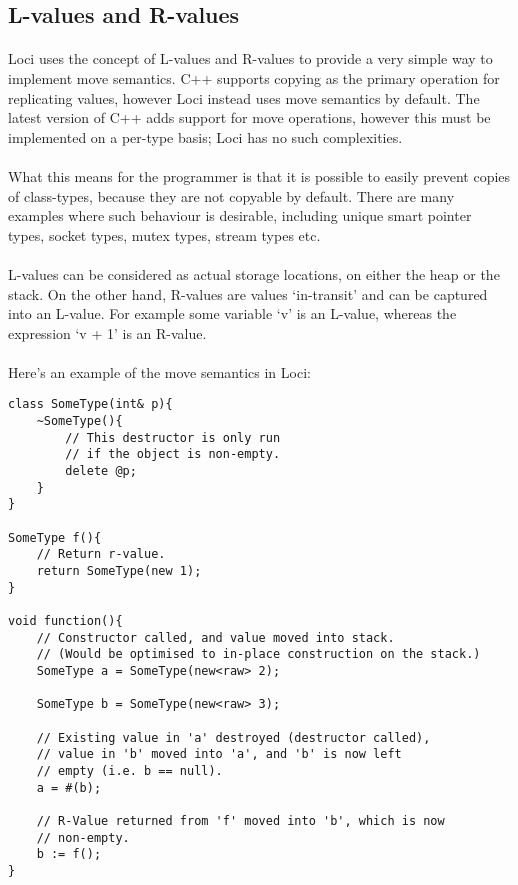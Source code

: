 \documentclass[12pt,twoside,notitlepage]{report}
\begin{document}
\clearpage

\subsection{L-values and R-values}

\paragraph{}
Loci uses the concept of L-values and R-values to provide a very simple way to implement move semantics. C++ supports copying as the primary operation for replicating values, however Loci instead uses move semantics by default. The latest version of C++ adds support for move operations, however this must be implemented on a per-type basis; Loci has no such complexities.

\paragraph{}
What this means for the programmer is that it is possible to easily prevent copies of class-types, because they are not copyable by default. There are many examples where such behaviour is desirable, including unique smart pointer types, socket types, mutex types, stream types etc.

\paragraph{}
L-values can be considered as actual storage locations, on either the heap or the stack. On the other hand, R-values are values `in-transit' and can be captured into an L-value. For example some variable `v' is an L-value, whereas the expression `v + 1' is an R-value.

\paragraph{}
Here's an example of the move semantics in Loci:

\begin{lstlisting}
class SomeType(int& p){
	~SomeType(){
		// This destructor is only run
		// if the object is non-empty.
		delete @p;
	}
}

SomeType f(){
	// Return r-value.
	return SomeType(new 1);
}

void function(){
	// Constructor called, and value moved into stack.
	// (Would be optimised to in-place construction on the stack.)
	SomeType a = SomeType(new<raw> 2);
	
	SomeType b = SomeType(new<raw> 3);
	
	// Existing value in 'a' destroyed (destructor called),
	// value in 'b' moved into 'a', and 'b' is now left
	// empty (i.e. b == null).
	a = #(b);
	
	// R-Value returned from 'f' moved into 'b', which is now
	// non-empty.
	b := f();
}
\end{lstlisting}
\end{document}
